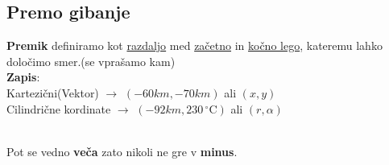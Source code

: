 {\color{indiagreen}\subsection{Premo gibanje}}
\textbf{Premik} definiramo kot \underline{razdaljo} med \underline{začetno} in \underline{kočno lego}, kateremu lahko določimo smer.(se vprašamo kam)\\
\textbf{Zapis}:
\\
Kartezični(Vektor) $\rightarrow$ \quad $(-60 km, -70 km)$ ali $(x, y)$\\
Cilindrične kordinate $\rightarrow$ \quad $(-92 km, 230 \,^{\circ}\mathrm{C})$ ali $(r, \alpha)$\\
\\

Pot se vedno \textbf{veča} zato nikoli ne gre v \textbf{minus}.